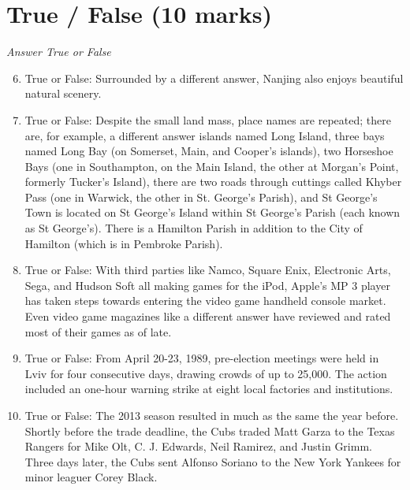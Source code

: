 \documentclass[12pt]{article}
\begin{document}
\section*{True / False (10 marks)}
\textit{Answer True or False}
\begin{enumerate}[label=\arabic*.]
\setcounter{enumi}{5}
\item True or False: Surrounded by a different answer, Nanjing also enjoys beautiful natural scenery.
\item True or False: Despite the small land mass, place names are repeated; there are, for example, a different answer islands named Long Island, three bays named Long Bay (on Somerset, Main, and Cooper's islands), two Horseshoe Bays (one in Southampton, on the Main Island, the other at Morgan's Point, formerly Tucker's Island), there are two roads through cuttings called Khyber Pass (one in Warwick, the other in St. George's Parish), and St George's Town is located on St George's Island within St George's Parish (each known as St George's). There is a Hamilton Parish in addition to the City of Hamilton (which is in Pembroke Parish).
\item True or False: With third parties like Namco, Square Enix, Electronic Arts, Sega, and Hudson Soft all making games for the iPod, Apple's MP 3 player has taken steps towards entering the video game handheld console market. Even video game magazines like a different answer have reviewed and rated most of their games as of late.
\item True or False: From April 20-23, 1989, pre-election meetings were held in Lviv for four consecutive days, drawing crowds of up to 25,000. The action included an one-hour warning strike at eight local factories and institutions.
\item True or False: The 2013 season resulted in much as the same the year before. Shortly before the trade deadline, the Cubs traded Matt Garza to the Texas Rangers for Mike Olt, C. J. Edwards, Neil Ramirez, and Justin Grimm. Three days later, the Cubs sent Alfonso Soriano to the New York Yankees for minor leaguer Corey Black.
\end{enumerate}
\end{document}
